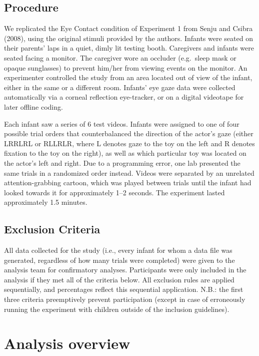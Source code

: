 \documentclass[,man,floatsintext]{apa6}
\begin{document}
\hypertarget{procedure}{%
\subsection{Procedure}\label{procedure}}

We replicated the Eye Contact condition of Experiment 1 from Senju and Csibra (2008), using the original stimuli provided by the authors. Infants were seated on their parents' laps in a quiet, dimly lit testing booth. Caregivers and infants were seated facing a monitor. The caregiver wore an occluder (e.g.~sleep mask or opaque sunglasses) to prevent him/her from viewing events on the monitor. An experimenter controlled the study from an area located out of view of the infant, either in the same or a different room. Infants' eye gaze data were collected automatically via a corneal reflection eye-tracker, or on a digital videotape for later offline coding.

Each infant saw a series of 6 test videos. Infants were assigned to one of four possible trial orders that counterbalanced the direction of the actor's gaze (either LRRLRL or RLLRLR, where L denotes gaze to the toy on the left and R denotes fixation to the toy on the right), as well as which particular toy was located on the actor's left and right. Due to a programming error, one lab presented the same trials in a randomized order instead. Videos were separated by an unrelated attention-grabbing cartoon, which was played between trials until the infant had looked towards it for approximately 1--2 seconds. The experiment lasted approximately 1.5 minutes.

\hypertarget{exclusion-criteria}{%
\subsection{Exclusion Criteria}\label{exclusion-criteria}}

All data collected for the study (i.e., every infant for whom a data file was generated, regardless of how many trials were completed) were given to the analysis team for confirmatory analyses. Participants were only included in the analysis if they met all of the criteria below. All exclusion rules are applied sequentially, and percentages reflect this sequential application. N.B.: the first three criteria preemptively prevent participation (except in case of erroneously running the experiment with children outside of the inclusion guidelines).

\hypertarget{analysis-overview}{%
\section{Analysis overview}\label{analysis-overview}}
\end{document}

